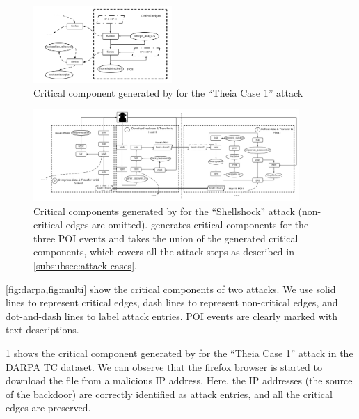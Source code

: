 \begin{figure}[t]
    \centering
    \includegraphics[width=0.47\textwidth]{figs/2021usenix/darpa.pdf}
    \caption{Critical component generated by \tool for the ``Theia Case 1'' attack}
    \label{fig:darpa}
\end{figure} 
\begin{figure}[t]
    \centering
    \includegraphics[width=0.9\textwidth, clip]{figs/2021usenix/multihost.pdf}
    \caption{Critical components generated by \tool for the ``Shellshock'' attack (non-critical edges are omitted). \tool generates critical components for the three POI events and takes the union of the generated critical components, which covers all the attack steps as described in \cref{subsubsec:attack-cases}.}
    \label{fig:multi}
\end{figure}

\cref{fig:darpa,fig:multi} show the critical components of two attacks. 
We use solid lines to represent critical edges, dash lines to represent non-critical edges, and dot-and-dash lines to label attack entries. 
POI events are clearly marked with text descriptions.

\cref{fig:darpa} shows the
critical component generated by \tool for the ``Theia Case 1'' attack in the DARPA TC dataset. 
We can observe that the firefox browser is started to download the file  from a malicious IP address.
Here, the IP addresses (\ie the source of the backdoor) are correctly identified as attack entries, and all the critical edges are preserved.



